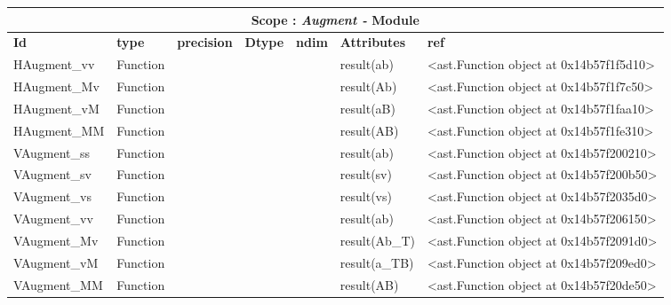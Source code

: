 \documentclass{report}
\begin{document}
 \vspace{1cm}

\begin{center}
\begin{longtable}{|p{3.5cm}|p{1.5cm}|p{1.5cm}|p{1.5cm}|p{1cm}|p{2cm}|p{4cm}| }
\hline
\multicolumn{7}{|c|}{\textbf{Scope : \qquad}  \textbf{\textit{Augment - }Module}}\\ 
\hline
\textbf{Id} & \textbf{type} & \textbf{precision} & \textbf{Dtype} & \textbf{ndim} & \textbf{Attributes} & \textbf{ref} \\\hline

HAugment\_vv & Function &  &  &  & result(ab) & <ast.Function object at 0x14b57f1f5d10> \\\hline

HAugment\_Mv & Function &  &  &  & result(Ab) & <ast.Function object at 0x14b57f1f7c50> \\\hline

HAugment\_vM & Function &  &  &  & result(aB) & <ast.Function object at 0x14b57f1faa10> \\\hline

HAugment\_MM & Function &  &  &  & result(AB) & <ast.Function object at 0x14b57f1fe310> \\\hline

VAugment\_ss & Function &  &  &  & result(ab) & <ast.Function object at 0x14b57f200210> \\\hline

VAugment\_sv & Function &  &  &  & result(sv) & <ast.Function object at 0x14b57f200b50> \\\hline

VAugment\_vs & Function &  &  &  & result(vs) & <ast.Function object at 0x14b57f2035d0> \\\hline

VAugment\_vv & Function &  &  &  & result(ab) & <ast.Function object at 0x14b57f206150> \\\hline

VAugment\_Mv & Function &  &  &  & result(Ab\_T) & <ast.Function object at 0x14b57f2091d0> \\\hline

VAugment\_vM & Function &  &  &  & result(a\_TB) & <ast.Function object at 0x14b57f209ed0> \\\hline

VAugment\_MM & Function &  &  &  & result(AB) & <ast.Function object at 0x14b57f20de50> \\\hline

\end{longtable}
\end{center}
\end{document}
